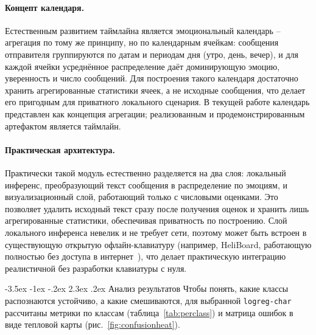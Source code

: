 \documentclass[12pt,a4paper]{report}
\makeatletter
\renewcommand{\section}{\@startsection{section}{1}{\z@}%
  {-3.5ex \@plus -1ex \@minus -.2ex}%
  {2.3ex \@plus .2ex}%
  {\normalfont\large\bfseries\centering}}
\makeatother
\begin{document}
\paragraph{Концепт календаря.} Естественным развитием таймлайна является эмоциональный календарь -- агрегация по тому же принципу, но по календарным ячейкам: сообщения отправителя группируются по датам и периодам дня (утро, день, вечер), и для каждой ячейки усреднённое распределение даёт доминирующую эмоцию, уверенность и число сообщений. Для построения такого календаря достаточно хранить агрегированные статистики ячеек, а не исходные сообщения, что делает его пригодным для приватного локального сценария. В текущей работе календарь представлен как концепция агрегации; реализованным и продемонстрированным артефактом является таймлайн.

\paragraph{Практическая архитектура.} Практически такой модуль естественно разделяется на два слоя: локальный инференс, преобразующий текст сообщения в распределение по эмоциям, и визуализационный слой, работающий только с числовыми оценками. Это позволяет удалить исходный текст сразу после получения оценок и хранить лишь агрегированные статистики, обеспечивая приватность по построению. Слой локального инференса невелик и не требует сети, поэтому может быть встроен в существующую открытую офлайн-клавиатуру (например, HeliBoard, работающую полностью без доступа в интернет~\cite{heliboard}), что делает практическую интеграцию реалистичной без разработки клавиатуры с нуля.

\section{Анализ результатов}
Чтобы понять, какие классы распознаются устойчиво, а какие смешиваются, для выбранной \texttt{logreg-char} рассчитаны метрики по классам (таблица~\ref{tab:perclass}) и матрица ошибок в виде тепловой карты (рис.~\ref{fig:confusionheat}).
\end{document}
